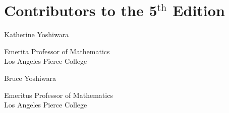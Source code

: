 \documentclass[10pt,]{book}
\theoremstyle{plain}
\theoremstyle{definition}
\theoremstyle{definition}
\theoremstyle{definition}
\theoremstyle{definition}
\numberwithin{equation}{part}
\begin{document}
\chapter*{Contributors to the 5\(^\mathrm{th}\) Edition}\label{preface-2}
\hypertarget{kyoshiwara}{}\noindent%
\parbox[t]{0.35\textwidth}{Katherine Yoshiwara}%
\parbox[t]{0.65\textwidth}{Emerita Professor of Mathematics\\Los Angeles Pierce College\\}\par
\hypertarget{bkyoshiwara}{}\noindent%
\parbox[t]{0.35\textwidth}{Bruce Yoshiwara}%
\parbox[t]{0.65\textwidth}{Emeritus Professor of Mathematics\\Los Angeles Pierce College\\}\par
\setcounter{tocdepth}{1}
\renewcommand*\contentsname{Contents}
\tableofcontents
\mainmatter
\typeout{************************************************}
\typeout{************************************************}
\end{document}
